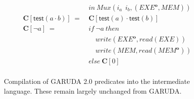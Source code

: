 \documentclass[12pt, letterpaper]{article}
\def \sysname {\textsc{GARUDA 2.0}\xspace}
\def \oldname {\textsc{GARUDA}\xspace}
\newcommand\obf[1]{#1^\mathbf{o}}
\begin{document}
\begin{figure}
\begin{align*}
              &in\ Mux(i_a\ \ i_b, (\obf{EXE},MEM))\\
            \mathbf{C}[\mathsf{test}(a \cdot b)]\ 
              =\ &\mathbf{C}[\mathsf{test}(a) \cdot \mathsf{test}(b)] \\
            \mathbf{C}[\neg a]\ 
              =\ 
              &if\ \neg a\ then\\
              &\quad write(\obf{EXE}, read(EXE))\\
              &\quad write(MEM, read(\obf{MEM}))\\
              &else\ \mathbf{C}[0]\\
          \end{align*}
          \caption{
            Compilation of \sysname predicates into the intermediate language.
            These remain largely unchanged from \oldname.
          }
          \label{fig:compile:compile:pred}
        \end{figure}
\end{document}
